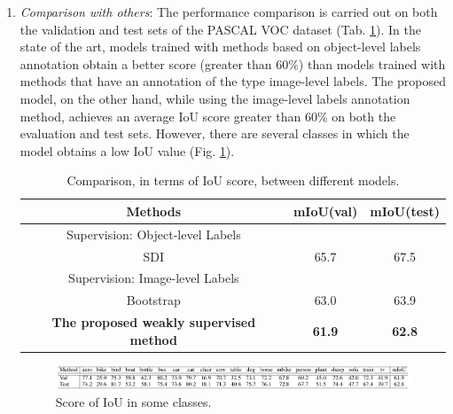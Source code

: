 \begin{enumerate}
    \item \emph{Comparison with others}: The performance comparison is carried out on both the validation and test sets of the PASCAL VOC dataset (Tab. \ref{IoU score comparison}). In the state of the art, models trained with methods based on object-level labels annotation obtain a better score (greater than 60\%) than models trained with methods that have an annotation of the type image-level labels. The proposed model, on the other hand, while using the image-level labels annotation method, achieves an average IoU score greater than 60\% on both the evaluation and test sets. However, there are several classes in which the model obtains a low IoU value (Fig. \ref{fig:classes}).
    \begin{table}[h!]
        \centering
        \begin{adjustbox}{max width=0.8\textwidth}
        \begin{tabular}{|c|c|c|}
            \hline
            Methods & mIoU(val) & mIoU(test)\\
            \hline
            Supervision: Object-level Labels & &\\
            SDI \cite{0876055513} & 65.7 & 67.5\\
            \hline
            Supervision: Image-level Labels & &\\
            Bootstrap \cite{0876055555} & 63.0 & 63.9\\
            \bfseries{The proposed weakly supervised method} & \bfseries{61.9} & \bfseries{62.8}\\
            \hline
        \end{tabular}
        \end{adjustbox}
        \caption{Comparison, in terms of IoU score, between different models.}
        \label{IoU score comparison}
    \end{table}
    \begin{figure}[h!]
        \centering
        \includegraphics[width = 1 \linewidth]{images/paper6/classes.png}
        \centering
        \caption{Score of IoU in some classes.}
        \label{fig:classes}
    \end{figure}
\end{enumerate}

